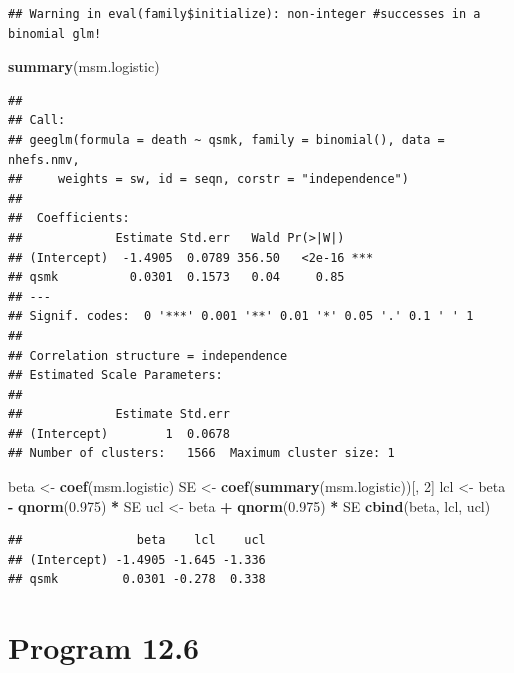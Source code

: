 \documentclass[
  10pt,
]{book}
\newenvironment{Shaded}{\begin{snugshade}}{\end{snugshade}}
\newcommand{\DecValTok}[1]{\textcolor[rgb]{0.00,0.00,0.81}{#1}}
\newcommand{\FloatTok}[1]{\textcolor[rgb]{0.00,0.00,0.81}{#1}}
\newcommand{\KeywordTok}[1]{\textcolor[rgb]{0.13,0.29,0.53}{\textbf{#1}}}
\newcommand{\NormalTok}[1]{#1}
\newcommand{\OperatorTok}[1]{\textcolor[rgb]{0.81,0.36,0.00}{\textbf{#1}}}
\newcommand{\StringTok}[1]{\textcolor[rgb]{0.31,0.60,0.02}{#1}}
\begin{document}
\begin{verbatim}
## Warning in eval(family$initialize): non-integer #successes in a binomial glm!
\end{verbatim}

\begin{Shaded}
\begin{Highlighting}[]
\KeywordTok{summary}\NormalTok{(msm.logistic)}
\end{Highlighting}
\end{Shaded}

\begin{verbatim}
## 
## Call:
## geeglm(formula = death ~ qsmk, family = binomial(), data = nhefs.nmv, 
##     weights = sw, id = seqn, corstr = "independence")
## 
##  Coefficients:
##             Estimate Std.err   Wald Pr(>|W|)    
## (Intercept)  -1.4905  0.0789 356.50   <2e-16 ***
## qsmk          0.0301  0.1573   0.04     0.85    
## ---
## Signif. codes:  0 '***' 0.001 '**' 0.01 '*' 0.05 '.' 0.1 ' ' 1
## 
## Correlation structure = independence 
## Estimated Scale Parameters:
## 
##             Estimate Std.err
## (Intercept)        1  0.0678
## Number of clusters:   1566  Maximum cluster size: 1
\end{verbatim}

\begin{Shaded}
\begin{Highlighting}[]
\NormalTok{beta <-}\StringTok{ }\KeywordTok{coef}\NormalTok{(msm.logistic)}
\NormalTok{SE <-}\StringTok{ }\KeywordTok{coef}\NormalTok{(}\KeywordTok{summary}\NormalTok{(msm.logistic))[, }\DecValTok{2}\NormalTok{]}
\NormalTok{lcl <-}\StringTok{ }\NormalTok{beta }\OperatorTok{-}\StringTok{ }\KeywordTok{qnorm}\NormalTok{(}\FloatTok{0.975}\NormalTok{) }\OperatorTok{*}\StringTok{ }\NormalTok{SE}
\NormalTok{ucl <-}\StringTok{ }\NormalTok{beta }\OperatorTok{+}\StringTok{ }\KeywordTok{qnorm}\NormalTok{(}\FloatTok{0.975}\NormalTok{) }\OperatorTok{*}\StringTok{ }\NormalTok{SE}
\KeywordTok{cbind}\NormalTok{(beta, lcl, ucl)}
\end{Highlighting}
\end{Shaded}

\begin{verbatim}
##                beta    lcl    ucl
## (Intercept) -1.4905 -1.645 -1.336
## qsmk         0.0301 -0.278  0.338
\end{verbatim}

\hypertarget{program-12.6}{%
\section{Program 12.6}\label{program-12.6}}
\end{document}

